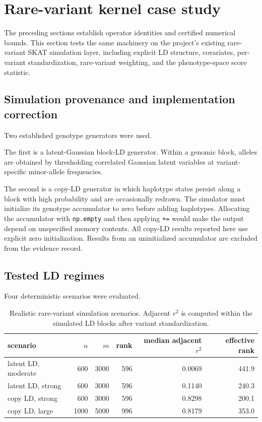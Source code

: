 \section{Rare-variant kernel case study}\label{sec:final-24}

The preceding sections establish operator identities and certified numerical
bounds.  This section tests the same machinery on the project's existing
rare-variant SKAT simulation layer, including explicit LD structure,
covariates, per-variant standardization, rare-variant weighting, and the
phenotype-space score statistic.

\subsection{Simulation provenance and implementation correction}

Two established genotype generators were used.

The first is a latent-Gaussian block-LD generator.  Within a genomic block,
alleles are obtained by thresholding correlated Gaussian latent variables at
variant-specific minor-allele frequencies.

The second is a copy-LD generator in which haplotype states persist along a
block with high probability and are occasionally redrawn. The simulator
must initialize its genotype accumulator to zero before adding haplotypes.
Allocating the accumulator with \verb|np.empty| and then applying
\verb|+=| would make the output depend on unspecified memory contents.
All copy-LD results reported here use explicit zero initialization. Results
from an uninitialized accumulator are excluded from the evidence record.

\subsection{Tested LD regimes}

Four deterministic scenarios were evaluated.

\begin{table}[htbp]
\centering
\caption{Realistic rare-variant simulation scenarios.  Adjacent $r^2$ is
computed within the simulated LD blocks after variant standardization.}
\begin{tabular}{lrrrrr}
\toprule
scenario & $n$ & $m$ & rank & median adjacent $r^2$ & effective rank\\
\midrule
latent LD, moderate & 600 & 3000 & 596 & 0.0069 & 441.9\\
latent LD, strong & 600 & 3000 & 596 & 0.1140 & 240.3\\
copy LD, strong & 600 & 3000 & 596 & 0.8298 & 200.1\\
copy LD, large & 1000 & 5000 & 996 & 0.8179 & 353.0\\
\bottomrule
\end{tabular}
\end{table}

